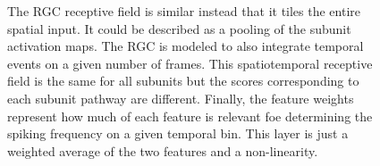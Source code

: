 \begin{figure}
{        The RGC receptive field is similar instead that it tiles the entire
        spatial input. It could be described as a pooling of the subunit
        activation
        maps. The RGC is modeled to also integrate temporal events on a given
        number of frames. This spatiotemporal receptive field is the same for
        all
        subunits but the scores corresponding to each subunit pathway are
        different.
        Finally, the feature weights represent how much of each feature is
        relevant foe
        determining the spiking frequency on a given temporal bin. This layer
        is just
        a weighted average of the two features and a non-linearity.
    }
    \label{fig:CNN_simple}
\end{figure}


